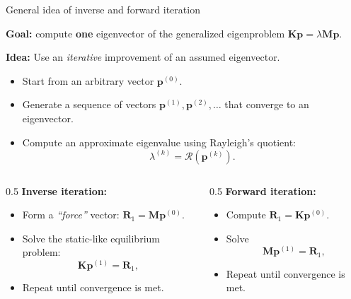 \documentclass[aspectratio=169]{beamer}
\begin{document}
{\begin{frame}{General idea of inverse and forward iteration}
  \vspace{-0.2cm}
  \small
  \begin{block}{}
    \textbf{Goal:} compute \textbf{one} eigenvector of the generalized eigenproblem \( \mathbf K\mathbf p = \lambda\mathbf M \mathbf p \).
  \end{block}
  \textbf{Idea:} Use an \emph{iterative} improvement of an assumed eigenvector.
  \begin{itemize}
    \item Start from an arbitrary vector $\mathbf p^{(0)}$.
    \item Generate a sequence of vectors $\mathbf p^{(1)}, \mathbf p^{(2)}, \dots$ that converge to an eigenvector.
    \item  Compute an approximate eigenvalue using Rayleigh's quotient:
          \[
            \lambda^{(k)} = \mathcal R(\mathbf p^{(k)}).
          \]
  \end{itemize}
  \begin{columns}[T]
    \begin{column}{0.5\textwidth}
      \textbf{Inverse iteration:}
      \begin{itemize}
        \item Form a \emph{“force”} vector:
              \(
              \mathbf R_1 = \mathbf M \mathbf p^{(0)}.
              \)
        \item Solve the static-like equilibrium problem:
              \[
                \mathbf K \mathbf p^{(1)} = \mathbf R_1,
              \]
        \item Repeat until convergence is met.
      \end{itemize}
    \end{column}
    \begin{column}{0.5\textwidth}
      \textbf{Forward iteration:}
      \begin{itemize}
        \item Compute $\mathbf R_1 = \mathbf K \mathbf p^{(0)}$.
        \item Solve
              \[
                \mathbf M \mathbf p^{(1)} = \mathbf R_1 ,
              \]
        \item Repeat until convergence is met.
      \end{itemize}
    \end{column}
  \end{columns}
\end{frame}


}
\end{document}
